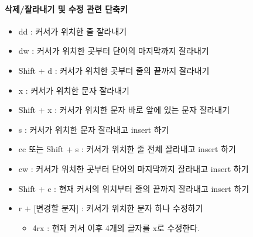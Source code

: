 \paragraph{삭제/잘라내기 및 수정 관련 단축키}
\begin{itemize}[$\bullet$]
    \item dd : 커서가 위치한 줄 잘라내기
    \item dw : 커서가 위치한 곳부터 단어의 마지막까지 잘라내기
    \item Shift + d : 커서가 위치한 곳부터 줄의 끝까지 잘라내기
    \item x : 커서가 위치한 문자 잘라내기
    \item Shift + x : 커서가 위치한 문자 바로 앞에 있는 문자 잘라내기
    \item s : 커서가 위치한 문자 잘라내고 insert 하기
    \item cc 또는 Shift + s : 커서가 위치한 줄 전체 잘라내고 insert 하기
    \item cw : 커서가 위치한 곳부터 단어의 마지막까지 잘라내고 insert 하기
    \item Shift + c : 현재 커서의 위치부터 줄의 끝까지 잘라내고 insert 하기
    \item r + [변경할 문자] : 커서가 위치한 문자 하나 수정하기
        \begin{itemize}[Ex)]
            \item 4rx : 현재 커서 이후 4개의 글자를 x로 수정한다.
        \end{itemize}
\end{itemize}
